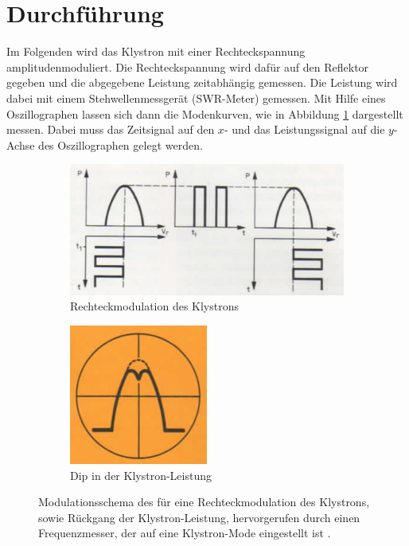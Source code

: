 \section{Durchführung}
Im Folgenden wird das Klystron mit einer Rechteckspannung amplitudenmoduliert.
Die Rechteckspannung wird dafür auf den Reflektor gegeben und die abgegebene
Leistung zeitabhängig gemessen.
Die Leistung wird dabei mit einem Stehwellenmessgerät (SWR-Meter) gemessen.
Mit Hilfe eines Oszillographen lassen sich dann die Modenkurven, wie in
Abbildung \ref{fig:moden} dargestellt messen.
Dabei muss das Zeitsignal auf den $x$- und das Leistungssignal auf die
$y$-Achse des Oszillographen gelegt werden.
\begin{figure}
    \centering
    \begin{subfigure}{0.6\linewidth}
        \centering
        \includegraphics[width=0.8\linewidth]{img/moden.png}
        \caption{
            Rechteckmodulation des Klystrons
        }
        \label{fig:moden}
    \end{subfigure}
    \begin{subfigure}{0.39\linewidth}
        \centering
        \includegraphics[width=0.8\linewidth]{img/dip.png}
        \caption{
            Dip in der Klystron-Leistung
        }
        \label{fig:dip}
    \end{subfigure}
    \caption{
        Modulationsschema des für eine Rechteckmodulation des Klystrons,
        sowie Rückgang der Klystron-Leistung, hervorgerufen durch einen
        Frequenzmesser, der auf eine Klystron-Mode eingestellt ist
        \cite{V53}.
    }
    \label{fig:moden-dip}
\end{figure}

